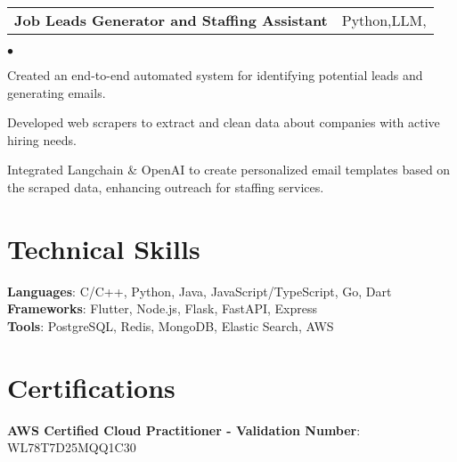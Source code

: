 \documentclass[margin, 11pt]{res}
\makeatletter
\newcommand{\resumeSubSubheading}[2]{
\begin{tabular*}{1.01\textwidth}{@{\hspace{-4pt}}l @{\extracolsep{\fill}} r}
    #1 & #2 
\end{tabular*}\vspace{-7pt}
}
\newenvironment{list2}{
	\begin{list}{$\bullet$}{%
	    \small
		\setlength{\itemsep}{0in}
		\setlength{\parsep}{0in} \setlength{\parskip}{0in}
		\setlength{\topsep}{0in} \setlength{\partopsep}{0in}
		\setlength{\leftmargin}{0.2in}}}{\end{list}}
\makeatother
\begin{document}
\begin{resume}
\resumeSubSubheading{\textbf{Job Leads Generator and Staffing Assistant}}
{Python,LLM,}

\begin{list2}
 \item Created an end-to-end automated system for identifying potential leads and generating emails.
        \item Developed web scrapers to extract and clean data about companies with active hiring needs.
        \item Integrated Langchain \& OpenAI to create personalized email templates based on the scraped data, enhancing outreach for staffing services.
\end{list2}


\section{\sc Technical Skills}

\textbf{Languages}{: C/C++, Python, Java, JavaScript/TypeScript, Go, Dart} \\
\textbf{Frameworks}{: Flutter, Node.js, Flask, FastAPI, Express} \\
\textbf{Tools}{: PostgreSQL, Redis, MongoDB, Elastic Search, AWS} 

\section{\sc Certifications}
\textbf{AWS Certified Cloud Practitioner - Validation Number}{: WL78T7D25MQQ1C30} \\

\vspace{0.2in}

\end{resume}
\end{document}
